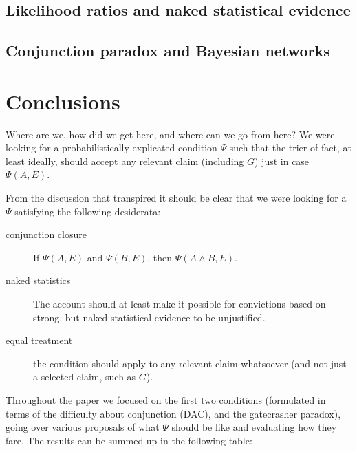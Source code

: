 \documentclass[10pt,dvipsnames,enabledeprecatedfontcommands]{scrartcl}
\newcommand{\et}{\wedge}
\begin{document}
\subsection{Likelihood ratios and naked statistical
evidence}\label{likelihood-ratios-and-naked-statistical-evidence}

\subsection{Conjunction paradox and Bayesian
networks}\label{conjunction-paradox-and-bayesian-networks}

\section{Conclusions}\label{conclusions}

Where are we, how did we get here, and where can we go from here? We
were looking for a probabilistically explicated condition \(\Psi\) such
that the trier of fact, at least ideally, should accept any relevant
claim (including \(G\)) just in case \(\Psi(A,E)\).

From the discussion that transpired it should be clear that we were
looking for a \(\Psi\) satisfying the following desiderata:

\begin{description}
\item[conjunction closure] If $\Psi(A,E)$ and $\Psi(B,E)$, then $\Psi(A\et B,E)$.
\item[naked statistics] The account should at least make it possible for convictions based on strong, but naked statistical evidence to be unjustified. 
\item[equal treatment] the condition should apply to any relevant claim whatsoever (and not just a selected claim, such as $G$).
\end{description}

Throughout the paper we focused on the first two conditions (formulated
in terms of the difficulty about conjunction (DAC), and the gatecrasher
paradox), going over various proposals of what \(\Psi\) should be like
and evaluating how they fare. The results can be summed up in the
following table:
\end{document}
